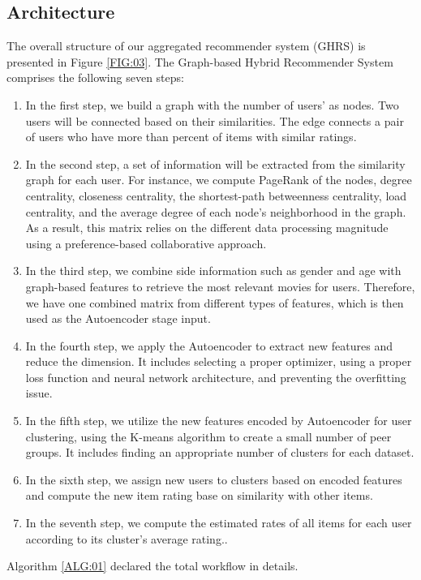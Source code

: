\documentclass[a4paper,fleqn]{cas-dc}
\begin{document}
\subsection{Architecture}
\label{architecture}
The overall structure of our aggregated recommender system (GHRS) is presented in Figure \ref{FIG:03}. The Graph-based Hybrid Recommender System comprises the following seven steps:
\begin{enumerate}
\item
In the first step, we build a graph with the number of users' as nodes. Two users will be connected based on their similarities. The edge connects a pair of users who have more than  percent of items with similar ratings.
\item
In the second step, a set of information will be extracted from the similarity graph for each user. For instance, we compute PageRank of the nodes, degree centrality, closeness centrality, the shortest-path betweenness centrality, load centrality, and the average degree of each node's neighborhood in the graph. As a result, this matrix relies on the different data processing magnitude using a preference-based collaborative approach.
\item
In the third step, we combine side information such as gender and age with graph-based features to retrieve the most relevant movies for users. Therefore, we have one combined matrix from different types of features, which is then used as the Autoencoder stage input.
\item
In the fourth step, we apply the Autoencoder to extract new features and reduce the dimension. It includes selecting a proper optimizer, using a proper loss function and neural network architecture, and preventing the overfitting issue.
\item
In the fifth step, we utilize the new features encoded by Autoencoder for user clustering, using the K-means algorithm to create a small number of peer groups. It includes finding an appropriate number of clusters for each dataset.
\item
In the sixth step, we assign new users to clusters based on encoded features and compute the new item rating base on similarity with other items.
\item
In the seventh step, we compute the estimated rates of all items for each user according to its cluster's average rating..
\end{enumerate}
  
Algorithm \ref{ALG:01} declared the total workflow in details.
\end{document}
